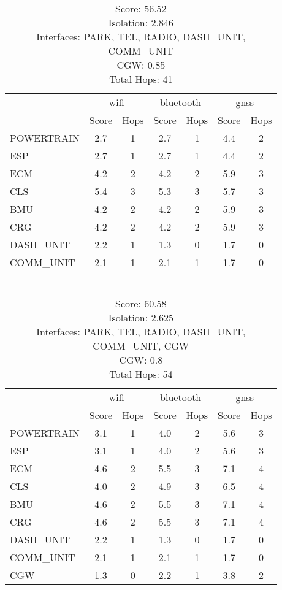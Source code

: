 \begin{table}[ht]
    \centering
    \caption{ \\ Score: 56.52 \\ Isolation: 2.846 \\ Interfaces: PARK, TEL, RADIO, DASH\_UNIT, COMM\_UNIT \\ CGW: 0.85 \\ Total Hops: 41}
    \label{tab:arch2}
    \begin{tabular}{lcccccc}
    \hline
     & \multicolumn{2}{c}{wifi} & \multicolumn{2}{c}{bluetooth} & \multicolumn{2}{c}{gnss} \\
     & Score & Hops & Score & Hops & Score & Hops \\
    \hline
    POWERTRAIN & 2.7 & 1 & 2.7 & 1 & 4.4 & 2 \\
    ESP & 2.7 & 1 & 2.7 & 1 & 4.4 & 2 \\
    ECM & 4.2 & 2 & 4.2 & 2 & 5.9 & 3 \\
    CLS & 5.4 & 3 & 5.3 & 3 & 5.7 & 3 \\
    BMU & 4.2 & 2 & 4.2 & 2 & 5.9 & 3 \\
    CRG & 4.2 & 2 & 4.2 & 2 & 5.9 & 3 \\
    DASH\_UNIT & 2.2 & 1 & 1.3 & 0 & 1.7 & 0 \\
    COMM\_UNIT & 2.1 & 1 & 2.1 & 1 & 1.7 & 0 \\
    \hline
    \end{tabular}
\end{table}

\newpage

\begin{table}[ht]
    \centering
    \caption{ \\ Score: 60.58 \\ Isolation: 2.625 \\ Interfaces: PARK, TEL, RADIO, DASH\_UNIT, COMM\_UNIT, CGW  \\ CGW: 0.8 \\ Total Hops: 54}
    \label{tab:arch3}
    \begin{tabular}{lcccccc}
    \hline
        & \multicolumn{2}{c}{wifi} & \multicolumn{2}{c}{bluetooth} & \multicolumn{2}{c}{gnss} \\
        & Score & Hops & Score & Hops & Score & Hops \\
    \hline
    POWERTRAIN & 3.1 & 1 & 4.0 & 2 & 5.6 & 3 \\
    ESP & 3.1 & 1 & 4.0 & 2 & 5.6 & 3 \\
    ECM & 4.6 & 2 & 5.5 & 3 & 7.1 & 4 \\
    CLS & 4.0 & 2 & 4.9 & 3 & 6.5 & 4 \\
    BMU & 4.6 & 2 & 5.5 & 3 & 7.1 & 4 \\
    CRG & 4.6 & 2 & 5.5 & 3 & 7.1 & 4 \\
    DASH\_UNIT & 2.2 & 1 & 1.3 & 0 & 1.7 & 0 \\
    COMM\_UNIT & 2.1 & 1 & 2.1 & 1 & 1.7 & 0 \\
    CGW & 1.3 & 0 & 2.2 & 1 & 3.8 & 2 \\
    \hline
    \end{tabular}
\end{table}
        

